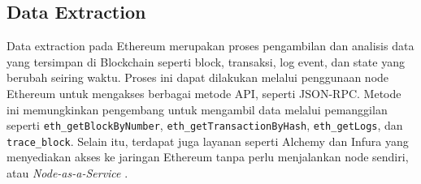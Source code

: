 \subsection{Data Extraction}
\label{subsec:data-extraction}

Data extraction pada Ethereum merupakan proses pengambilan dan analisis data yang tersimpan di Blockchain seperti block, transaksi, log event, dan state yang berubah seiring waktu. Proses ini dapat dilakukan melalui penggunaan node Ethereum untuk mengakses berbagai metode API, seperti JSON-RPC. Metode ini memungkinkan pengembang untuk mengambil data melalui pemanggilan seperti \texttt{eth\_getBlockByNumber}, \texttt{eth\_getTransactionByHash}, \texttt{eth\_getLogs}, dan \texttt{trace\_block}. Selain itu, terdapat juga layanan seperti Alchemy dan Infura yang menyediakan akses ke jaringan Ethereum tanpa perlu menjalankan node sendiri, atau \textit{Node-as-a-Service} \parencite{ethereum_jsonrpc}.